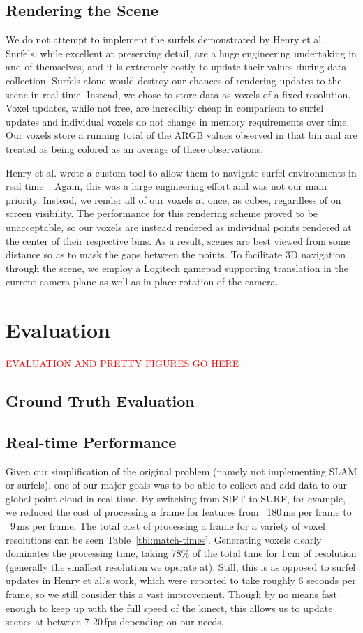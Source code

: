 \documentclass[letterpaper, 10pt, conference]{ieeeconf}
\newcommand{\xxx}[1]{\textcolor{red}{#1}}
\begin{document}
\subsection{Rendering the Scene}
We do not attempt to implement the surfels demonstrated by Henry et al.
Surfels, while excellent at preserving detail, are a huge engineering
undertaking in and of themselves, and it is extremely costly to
update their values during data collection. Surfels alone would destroy our
chances of rendering updates to the scene in real time. Instead, we chose to
store data as voxels of a fixed resolution. Voxel updates, while not free, are
incredibly cheap in comparison to surfel updates and
individual voxels do not change in memory requirements over time. Our
voxels store a running total of the ARGB values observed in that bin and are
treated as being colored as an average of these observations.

Henry et al. wrote a custom tool to allow them to navigate surfel environments
in real time~\cite{Henry2010rgbd}. Again, this was a large engineering effort
and was not our main priority. Instead, we render all of our voxels at once,
as cubes, regardless of on screen visibility. The performance for this
rendering scheme proved to be unacceptable, so our voxels are instead rendered
as individual points rendered at the center of their respective bins. As a
result, scenes are best viewed from some distance so as to mask the gaps
between the points. To facilitate 3D navigation through the scene, we employ a
Logitech gamepad supporting translation in the current camera plane as well as
in place rotation of the camera.

\section{Evaluation}
\xxx{EVALUATION AND PRETTY FIGURES GO HERE}
\subsection{Ground Truth Evaluation}

\subsection{Real-time Performance}
Given our simplification of the original problem (namely not implementing SLAM
or surfels), one of our major goals was to be able to collect and add data to
our global point cloud in real-time. By switching from SIFT to SURF, for
example, we reduced the cost of processing a frame for features from
~180\,ms per frame to ~9\,ms per frame. The total cost of processing a frame
for a variety of voxel resolutions
can be seen Table~\ref{tbl:match-times}. Generating voxels clearly dominates the
processing time, taking 78\% of the total time for 1\,cm of resolution
(generally the smallest resolution we operate at). Still, this is as opposed
to surfel updates in Henry et al.'s work, which were reported to take roughly
6 seconds per frame, so we still consider this a vast improvement. Though by
no means fast enough to keep up with the full speed of the kinect, this allows
us to update scenes at between 7-20\,fps depending on our needs.
\end{document}
